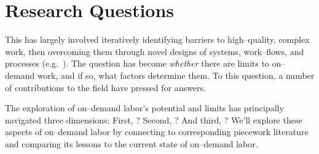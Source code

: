 \documentclass[pn4226]{subfiles}
\begin{document}
\section{Research Questions}

This has largely involved iteratively
identifying barriers to high--quality, complex work, then
overcoming them through novel designs of
systems, work--flows, and processes
(e.g.~\cite{bernsteinSoylent,foundry,crowdForgeKittur}).
The question 
has become \textit{whether} there are limits to on--demand work,
and if so, what factors determine them.
To this question, a number of contributions to the field have pressed for answers.

The exploration of on--demand labor's potential and limits has principally 
navigated three dimensions:
First, ?
Second, ?
And third, ?
We'll explore these aspects of on--demand labor by connecting to corresponding piecework literature
and comparing its lessons to the current state of on--demand labor.


\notinsubfile{
  
  
  
}

\onlyinsubfile{
  \printbibliography{}
}
\end{document}
